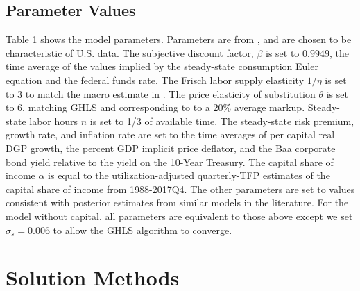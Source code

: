 \documentclass[12pt, final]{article}
\begin{document}
\subsection{Parameter Values} \hyperlink{Table 1}{Table 1} shows the model parameters. Parameters are from \hyperlink{Atkinson}{\color{black}{Atkinson et al.\ (2019)}}, and are chosen to be characteristic of U.S. data. The subjective discount factor, $\beta$ is set to $0.9949$, the time average of the values implied by the steady-state consumption Euler equation and the federal funds rate. The Frisch labor supply elasticity $1/\eta$ is set to 3 to match the macro estimate in \hyperlink{Peterman}{\color{black}{Peterman (2016)}}. The price elasticity of substitution $\theta$ is set to 6, matching GHLS and corresponding to to a 20\% average markup. Steady-state labor hours $\bar{n}$ is set to 1/3 of available time. The steady-state risk premium, growth rate, and inflation rate are set to the time averages of per capital real DGP growth, the percent GDP implicit price deflator, and the Baa corporate bond yield relative to the yield on the 10-Year Treasury. The capital share of income $\alpha$ is equal to the \hyperlink{Fernald}{\color{black}{Fernald (2012)}} utilization-adjusted quarterly-TFP estimates of the capital share of income from 1988-2017Q4. The other parameters are set to values consistent with posterior estimates from similar models in the literature. For the model without capital, all parameters are equivalent to those above except we set $\sigma_s=0.006$ to allow the GHLS algorithm to converge.

\section[Section 3]{Solution Methods \hypertarget{Section 3}{}} 
\end{document}
